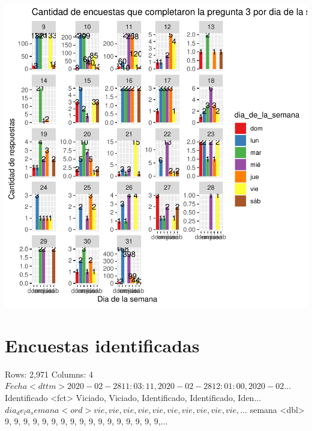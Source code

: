 \documentclass{article}
\begin{document}
\includegraphics{seguimientov5-026}

\section{Encuestas identificadas}

\begin{Schunk}
\begin{Soutput}
Rows: 2,971
Columns: 4
$ Fecha            <dttm> 2020-02-28 11:03:11, 2020-02-28 12:01:00, 2020-02...
$ Identificado     <fct> Viciado, Viciado, Identificado, Identificado, Iden...
$ dia_de_la_semana <ord> vie, vie, vie, vie, vie, vie, vie, vie, vie, vie, ...
$ semana           <dbl> 9, 9, 9, 9, 9, 9, 9, 9, 9, 9, 9, 9, 9, 9, 9, 9, 9,...
\end{Soutput}
\end{Schunk}
\end{document}

